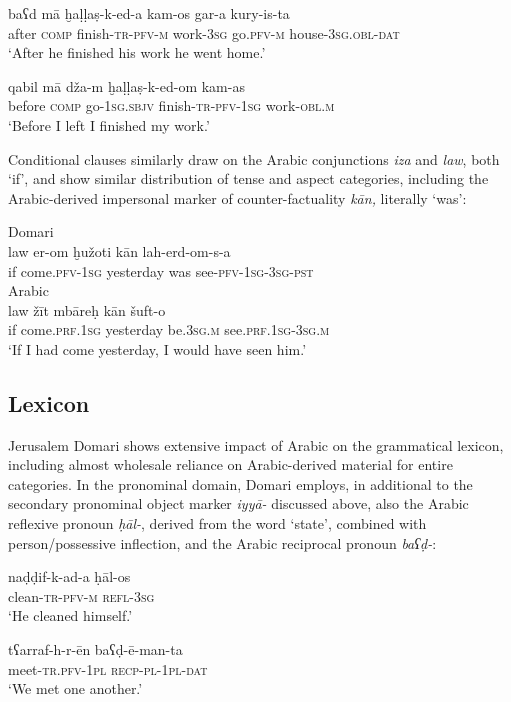 \documentclass[output=paper]{langsci/langscibook}
\begin{document}
\ea\label{after} \gll baʕd mā ḫaḷḷaṣ-k-ed-a kam-os gar-a kury-is-ta\\
     after \textsc{comp} finish-\textsc{tr-pfv-m} work-\textsc{3sg} go.\textsc{pfv-m} house-\textsc{3sg.obl-dat}\\
\glt     ‘After he finished his work he went home.’
\z

\ea\label{before} \gll qabil mā dža-m ḫaḷḷaṣ-k-ed-om kam-as\\
       before  \textsc{comp} go-\textsc{1sg.sbjv} finish-\textsc{tr-pfv-1sg} work-\textsc{obl.m}\\
\glt     ‘Before I left I finished my work.’
\z

Conditional clauses similarly draw on the Arabic conjunctions \textit{iza} and \textit{law}, both ‘if’, and show similar distribution of tense and aspect categories, including the Arabic-derived impersonal marker of counter-factuality \textit{kān,} literally ‘was’:

\ea
\ea
{Domari}\\
\gll law er-om ḫužoti kān lah-erd-om-s-a \\
       if come.\textsc{pfv-1sg} yesterday was see-\textsc{pfv-1sg-3sg-pst}\\
\ex
{Arabic}\\
\gll law žīt mbāreḥ kān šuft-o  \\
       if come.\textsc{prf.1sg} yesterday be.\textsc{3sg.m} see.\textsc{prf.1sg-3sg.m}\\
\glt   ‘If I had come yesterday, I would have seen him.’
\z
\z

\subsection{Lexicon
}

Jerusalem Domari shows extensive impact of Arabic on the grammatical lexicon, including almost wholesale reliance on Arabic-derived material for entire categories. In the pronominal domain, Domari employs, in additional to the secondary pronominal object marker \textit{iyyā-} discussed above, also the Arabic reflexive pronoun \textit{ḥāl-}, derived from the word ‘state’, combined with person/possessive inflection, and the Arabic reciprocal pronoun \textit{baʕḍ-}:

\ea \gll naḍḍif-k-ad-a ḥāl-os\\
     clean-\textsc{tr-pfv-m} \textsc{refl-3sg}\\
\glt ‘He cleaned himself.’
\z

\ea \gll tʕarraf-h-r-ēn baʕḍ-ē-man-ta\\
     meet-\textsc{tr.pfv-1pl} \textsc{recp-pl-1pl-dat}\\
\glt ‘We met one another.’
\z
\end{document}
